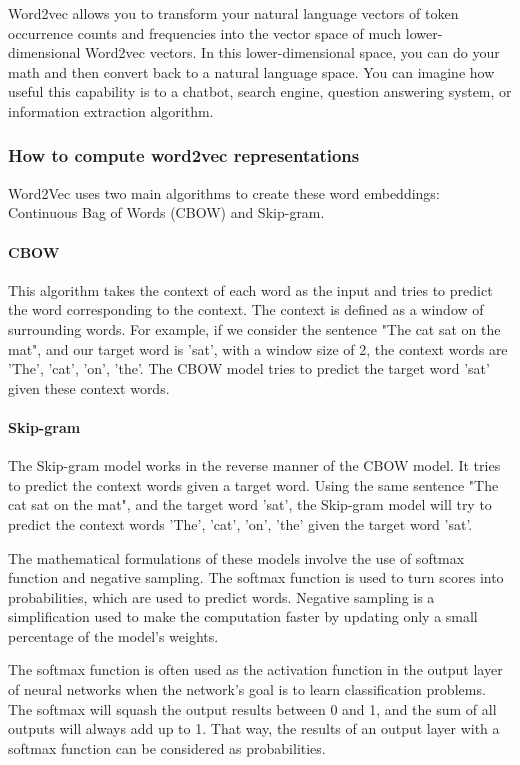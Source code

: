\documentclass{article}
\begin{document}
Word2vec allows you to transform your natural language vectors of token occurrence counts and frequencies into the vector space of much lower-dimensional Word2vec vectors. In this lower-dimensional space, you can do your math and then convert back to a natural language space. You can imagine how useful this capability is to a chatbot, search engine, question answering system, or information extraction algorithm.

\subsubsection*{How to compute word2vec representations}

Word2Vec uses two main algorithms to create these word embeddings: Continuous Bag of Words (CBOW) and Skip-gram.

\paragraph{CBOW} This algorithm takes the context of each word as the 
input and tries to predict the word corresponding to the context. The 
context is defined as a window of surrounding words. For example, if 
we consider the sentence "The cat sat on the mat", and our target 
word is 'sat', with a window size of 2, the context words are 'The', 
'cat', 'on', 'the'. The CBOW model tries to predict the target word 
'sat' given these context words.

\paragraph{Skip-gram} The Skip-gram model works in the reverse manner 
of the CBOW model. It tries to predict the context words given a 
target word. Using the same sentence "The cat sat on the mat", and 
the target word 'sat', the Skip-gram model will try to predict the 
context words 'The', 'cat', 'on', 'the' given the target word 'sat'.

The mathematical formulations of these models involve the use of 
softmax function and negative sampling. The softmax function is used 
to turn scores into probabilities, which are used to predict words. 
Negative sampling is a simplification used to make the computation 
faster by updating only a small percentage of the model's weights.

The softmax function is often used as the activation function in the output layer of neural 
networks when the network’s goal is to learn classification problems. The softmax will squash 
the output results between 0 and 1, and the sum of all outputs will always add up to 1. That 
way, the results of an output layer with a softmax function can be considered as 
probabilities.
\end{document}
